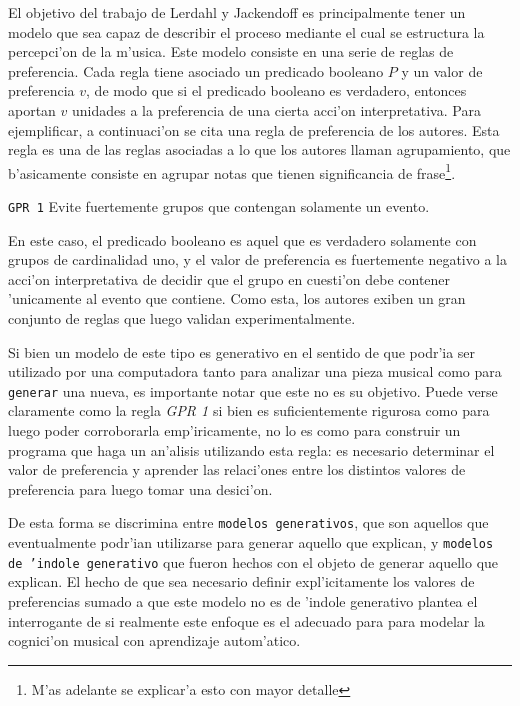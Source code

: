 El objetivo del trabajo de Lerdahl y Jackendoff es principalmente tener un modelo que sea capaz de describir el proceso mediante el cual se estructura la percepci'on de la m'usica. 
Este modelo consiste en una serie de reglas de preferencia. Cada regla tiene asociado un predicado booleano $P$ y un valor de preferencia $v$, 
de modo que si el predicado booleano es verdadero, entonces aportan $v$ unidades a la preferencia de una cierta acci'on interpretativa. Para ejemplificar, a continuaci'on se cita
una regla de preferencia de los autores. Esta regla es una de las reglas asociadas a lo que los autores llaman agrupamiento, que b'asicamente consiste en agrupar notas que tienen
significancia de frase\footnote{M'as adelante se explicar'a esto con mayor detalle}.
\newline

\begin{center}
\texttt{GPR 1} Evite fuertemente grupos que contengan solamente un evento.
\end{center}

En este caso, el predicado booleano es aquel que es verdadero solamente con grupos de cardinalidad uno, y el valor de preferencia es fuertemente negativo a la acci'on interpretativa
de decidir que el grupo en cuesti'on debe contener 'unicamente al evento que contiene. Como esta, los autores exiben un gran conjunto de reglas que luego validan experimentalmente. 

Si bien un modelo de este tipo es generativo en el sentido de que podr'ia ser utilizado por una computadora tanto para analizar una pieza musical como para 
\texttt{generar} una nueva, es importante notar que este no es su objetivo. 
Puede verse claramente como la regla \emph{GPR 1} si bien es suficientemente rigurosa como para luego poder corroborarla emp'iricamente, no lo es como para construir un 
programa que haga un an'alisis utilizando esta regla: es necesario determinar el valor de preferencia y aprender las relaci'ones entre los distintos valores de preferencia para luego 
tomar una desici'on.  

De esta forma se discrimina entre \texttt{modelos generativos}, que son aquellos que eventualmente podr'ian utilizarse para generar aquello que explican, y 
\texttt{modelos de 'indole generativo} que fueron hechos con el objeto de generar aquello que explican.  El hecho de que sea necesario definir expl'icitamente los valores de preferencias
sumado a que este modelo no es de 'indole generativo plantea el interrogante de si realmente este enfoque es el adecuado para para modelar la cognici'on musical con aprendizaje 
autom'atico. 

